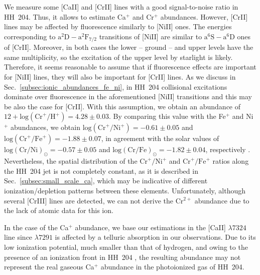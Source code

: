 \documentclass[twocolumn]{aastex63}
\begin{document}
We measure some [Ca\thinspace II] and [Cr\thinspace II] lines with a good signal-to-noise ratio in HH~204. Thus, it allows to estimate Ca$^{+}$ and Cr$^{+}$ abundances. However, [Cr\thinspace II] lines may be affected by fluorescence similarly to [Ni\thinspace II] ones. The energies corresponding to  $\text{a}^{2}\text{D}-\text{a}^{2}\text{F}_{7/2}$ transitions of [Ni\thinspace II] are similar to $\text{a}^{6}\text{S}-\text{a}^{6}\text{D}$ ones of [Cr\thinspace II]. Moreover, in both cases the lower -- ground -- and upper levels have the same multiplicity, so the excitation of the upper level by starlight is likely. Therefore, it seems reasonable to assume that if fluorescence effects are important for [Ni\thinspace II] lines, they will also be important for [Cr\thinspace II] lines. As we discuss in Sec.~\ref{subsec:ionic_abundances_fe_ni}, in HH~204 collisional excitations dominate over fluorescence in the aforementioned [Ni\thinspace II] transitions and this may be also the case for [Cr\thinspace II]. With this assumption, we obtain an abundance of $12+\text{log}(\text{Cr}^{+}/\text{H}^{+})=4.28\pm 0.03$. By comparing this value with the Fe$^{+}$ and Ni$^{+}$ abundances, we obtain $\text{log}(\text{Cr}^{+}/\text{Ni}^{+})=-0.61\pm 0.05$ and $\text{log}(\text{Cr}^{+}/\text{Fe}^{+})=-1.88\pm 0.07$, in agreement with the solar values of  $\text{log}(\text{Cr} /\text{Ni})_{\odot}=-0.57\pm 0.05$ and $\text{log}(\text{Cr}/\text{Fe})_{\odot}=-1.82\pm 0.04$, respectively \citep{lodders19}. Nevertheless, the spatial distribution of the $\text{Cr}^{+}/\text{Ni}^{+}$ and $\text{Cr}^{+}/\text{Fe}^{+}$ ratios along the HH~204 jet is not completely constant, as it is described in Sec.~\ref{subsec:small_scale_ca}, which may be indicative of different ionization/depletion patterns between these elements. Unfortunately, although several [Cr\thinspace III] lines are detected, we can not derive the Cr$^{2+}$ abundance due to the lack of atomic data for this ion.

In the case of the Ca$^{+}$ abundance, we base our estimations in the [Ca\thinspace II] $\lambda 7324$ line since $\lambda 7291$ is affected by a telluric absorption in our observations. Due to its low ionization potential, much smaller than that of hydrogen, and owing to the presence of an ionization front in HH~204 \citep{nunezdiaz12}, the resulting abundance may not represent the real gaseous Ca$^{+}$ abundance in the photoionized gas of HH~204.

\end{document}
